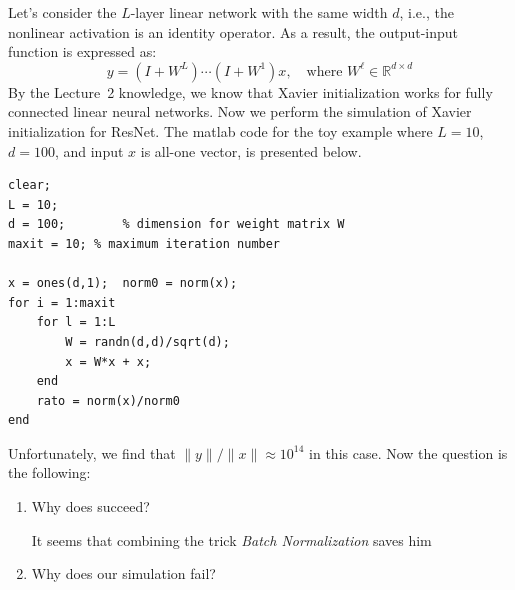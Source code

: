 \begin{example}
Let's consider the $L$-layer linear network with the same width $d$, i.e., the nonlinear activation is an identity operator. 
As a result, the output-input function is expressed as:
\[
y = (I+W^L)\cdots(I+W^1)x,\quad\text{where }W^{\ell}
\in\mathbb{R}^{d\times d}
\]
By the Lecture~2 knowledge, we know that Xavier initialization works for fully connected linear neural networks. Now we perform the simulation of Xavier initialization for ResNet.
The matlab code for the toy example where $L=10$, $d=100$, and input $x$ is all-one vector, is presented below.
\clearpage
\begin{verbatim}
clear;
L = 10;
d = 100;		% dimension for weight matrix W
maxit = 10;	% maximum iteration number	

x = ones(d,1);  norm0 = norm(x);
for i = 1:maxit
    for l = 1:L
        W = randn(d,d)/sqrt(d);
        x = W*x + x;
    end
    rato = norm(x)/norm0
end
\end{verbatim}
Unfortunately, we find that $\|y\|/\|x\|\approx10^{14}$ in this case.
Now the question is the following:
\begin{enumerate}
\item
Why does \citep{He2016res} succeed?

It seems that combining the trick \emph{Batch Normalization} saves him
\item
Why does our simulation fail?


\end{enumerate}
\end{example}
